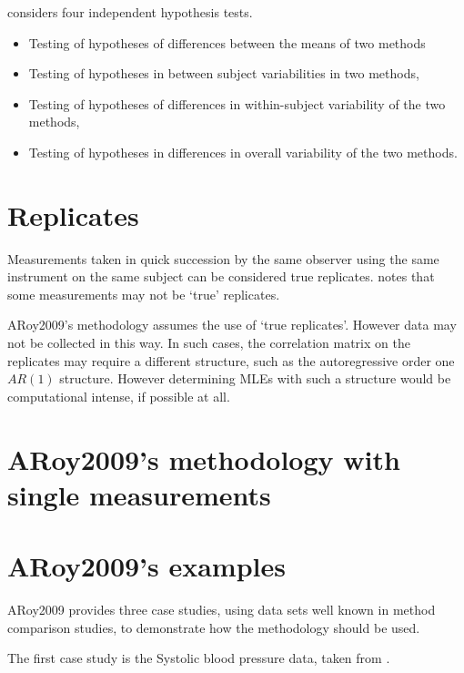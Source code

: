 \documentclass[12pt, a4paper]{report}
\theoremstyle{plain}
\theoremstyle{definition}
\theoremstyle{remark}
\begin{document}
	\citet{AARoy20092009} considers four independent hypothesis tests.
	\begin{itemize}
		\item Testing of hypotheses of differences between the means of
		two methods\item Testing of hypotheses in between subject
		variabilities in two methods, \item Testing of hypotheses of
		differences in within-subject variability of the two methods,
		\item Testing of hypotheses in differences in overall variability
		of the two methods.
	\end{itemize}
	
	
	\section{Replicates}
	Measurements taken in quick succession by the same observer using the same instrument on the same subject can be considered true replicates. \citet{ARoy20092009} notes that some measurements may not be `true' replicates.
	
	ARoy2009's methodology assumes the use of `true replicates'. However data may not be collected in this way. In such cases, the correlation matrix on the replicates may require a different structure, such as the autoregressive order one $AR(1)$ structure. However determining MLEs with such a structure would be computational intense, if possible at all.
	

	\section{ARoy2009's methodology with single measurements}
	
	
	\section{ARoy2009's examples}
	ARoy2009 provides three case studies, using data sets well known in method comparison studies, to demonstrate how the methodology should be used.
	
	
	
	The first case study is the Systolic blood pressure data, taken from \citet{BA99}.
	
	
	
\end{document}
